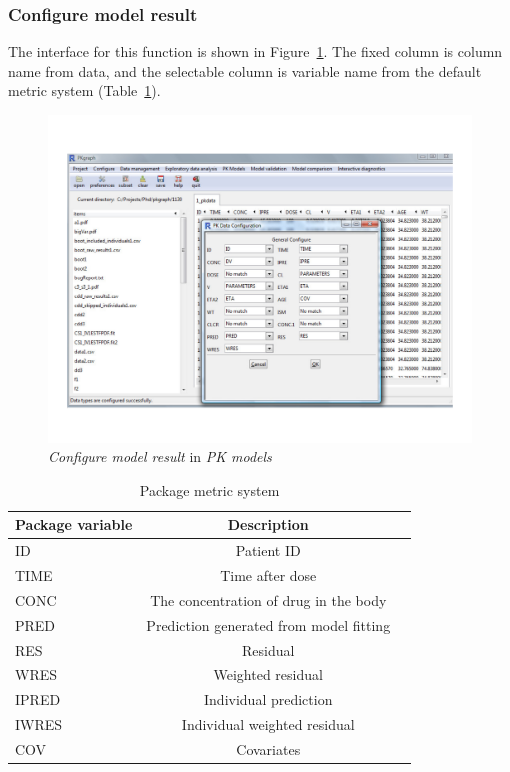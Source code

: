 \documentclass[a4paper]{article}
\begin{document}
\subsubsection{Configure model result}
The interface for this function is shown in Figure~\ref{pkmodel_config}. The fixed column is column name from data, and the selectable column is variable name from the default metric system (Table~\ref{c2_s3_t1}).\begin{figure}[h!tb] \centering
\includegraphics[scale=0.6]{pkmodel_config.pdf}
\caption{\textit{Configure model result} in \textit{PK models}}
\label{pkmodel_config}
\end{figure}
\begin{table}[h!tb] \centering
\begin{tabular}{lcc} \hline
\textbf{Package variable} & \textbf{Description}  \\ \hline
ID & Patient ID \\
TIME & Time after dose \\
CONC & The concentration of drug in the body \\
PRED & Prediction generated from model fitting \\
RES & Residual \\
WRES & Weighted residual \\
IPRED & Individual prediction \\
IWRES & Individual weighted residual \\
COV & Covariates \\ \hline
\end{tabular}
\caption{Package metric system}
\label{c2_s3_t1}
\end{table}
\end{document}
